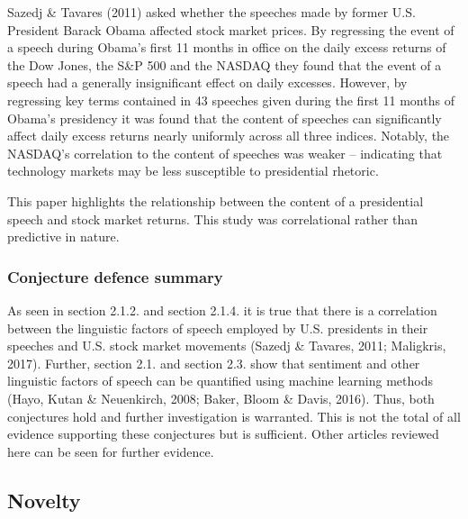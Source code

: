 \documentclass[11pt,preprint, authoryear]{elsarticle}
\numberwithin{equation}{section}
\numberwithin{figure}{section}
\numberwithin{table}{section}
\begin{document}
Sazedj \& Tavares (2011) asked whether the speeches made by former U.S.
President Barack Obama affected stock market prices. By regressing the
event of a speech during Obama's first 11 months in office on the daily
excess returns of the Dow Jones, the S\&P 500 and the NASDAQ they found
that the event of a speech had a generally insignificant effect on daily
excesses. However, by regressing key terms contained in 43 speeches
given during the first 11 months of Obama's presidency it was found that
the content of speeches can significantly affect daily excess returns
nearly uniformly across all three indices. Notably, the NASDAQ's
correlation to the content of speeches was weaker -- indicating that
technology markets may be less susceptible to presidential rhetoric.

This paper highlights the relationship between the content of a
presidential speech and stock market returns. This study was
correlational rather than predictive in nature.

\hypertarget{conjecture-defence-summary}{%
\subsubsection{Conjecture defence
summary}\label{conjecture-defence-summary}}

As seen in section 2.1.2. and section 2.1.4. it is true that there is a
correlation between the linguistic factors of speech employed by U.S.
presidents in their speeches and U.S. stock market movements (Sazedj \&
Tavares, 2011; Maligkris, 2017). Further, section 2.1. and section 2.3.
show that sentiment and other linguistic factors of speech can be
quantified using machine learning methods (Hayo, Kutan \& Neuenkirch,
2008; Baker, Bloom \& Davis, 2016). Thus, both conjectures hold and
further investigation is warranted. This is not the total of all
evidence supporting these conjectures but is sufficient. Other articles
reviewed here can be seen for further evidence.

\hypertarget{novelty}{%
\subsection{Novelty}\label{novelty}}
\end{document}

